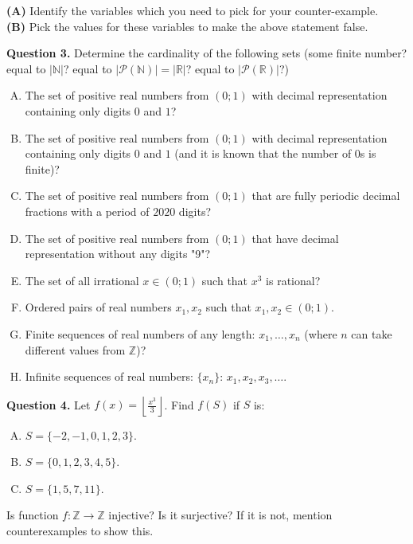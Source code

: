 \documentclass[jou]{apa6}
\begin{document}
\noindent
{\bf (A)} Identify the variables which you need to pick for your counter-example.\\
{\bf (B)} Pick the values for these variables to make the above statement false.


\vspace{6pt}
{\bf Question 3.} Determine the cardinality of the following sets (some finite number? 
equal to $|\mathbb{N}|$? equal to $|\mathcal{P}(\mathbb{N})| = |\mathbb{R}|$? equal to $|\mathcal{P}(\mathbb{R})|$?)
\begin{enumerate}[(A)]
\item The set of positive real numbers from $(0;1)$ with decimal representation 
containing only digits $0$ and $1$? 
\item The set of positive real numbers from $(0;1)$ with decimal representation 
containing only digits $0$ and $1$ (and it is known that the number of $0$s is finite)? 
\item The set of positive real numbers from $(0;1)$ that are fully periodic decimal fractions with 
a period of $2020$ digits? 
\item The set of positive real numbers from $(0;1)$ that have decimal representation 
without any digits "9"?
\item The set of all irrational $x \in (0;1)$ such that $x^3$ is rational?
\item Ordered pairs of real numbers $x_1,x_2$ such that $x_1,x_2 \in (0;1)$. 
\item Finite sequences of real numbers of any length: $x_1,\ldots,x_n$ (where $n$ can 
take different values from $\mathbb{Z}$)? 
\item Infinite sequences of real numbers: $\{ x_n \}$: $x_1,x_2,x_3,\ldots$.
\end{enumerate}


\vspace{6pt}
{\bf Question 4.}
Let ${\displaystyle f(x) = \left\lfloor \frac{x^3}{3} \right\rfloor}$. Find $f(S)$ if $S$ is:
\begin{enumerate}[(A)]
\item $S = \{ −2, −1, 0, 1, 2, 3 \}$.
\item $S = \{0, 1, 2, 3, 4, 5 \}$.
\item $S = \{1, 5, 7, 11 \}$.
\end{enumerate}
Is function $f: \mathbb{Z} \rightarrow \mathbb{Z}$ injective? Is it surjective? 
If it is not, mention counterexamples to show this. 
\end{document}
